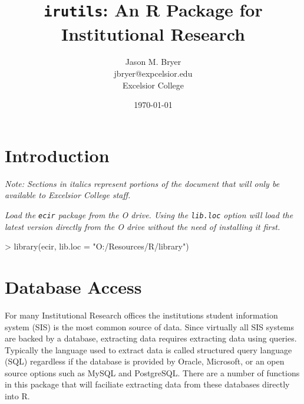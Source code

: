 \documentclass[letterpaper,11pt]{article}
\begin{document}
\title{\texttt{irutils}: An R Package for Institutional Research}
\author{Jason M. Bryer\\
\small{}jbryer@expcelsior.edu\\
Excelsior College}
\date{\today}

\maketitle



\section{Introduction}

\textit{Note: Sections in italics represent portions of the document that will only be available to Excelsior College staff.}

\textit{Load the \texttt{ecir} package from the O drive. Using the \texttt{lib.loc} option will load the latest version directly from the O drive without the need of installing it first.}

\begin{Schunk}
\begin{Sinput}
> library(ecir, lib.loc = "O:/Resources/R/library")
\end{Sinput}
\end{Schunk}


\section{Database Access}

For many Institutional Research offices the institutions student information system (SIS) is the most common source of data. Since virtually all SIS systems are backed by a database, extracting data requires extracting data using queries. Typically the language used to extract data is called structured query language (SQL) regardless if the database is provided by Oracle, Microsoft, or an open source options such as MySQL and PostgreSQL. There are a number of functions in this package that will faciliate extracting data from these databases directly into R.
\end{document}
